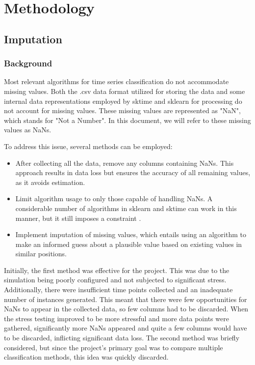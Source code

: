 \chapter{Methodology}

\section{Imputation}

\subsection{Background}
Most relevant algorithms for time series classification do not accommodate missing values. Both the .csv data format utilized for storing the data and some internal data representations employed by sktime and sklearn for processing do not account for missing values. These missing values are represented as "NaN", which stands for "Not a Number". In this document, we will refer to these missing values as NaNs.

To address this issue, several methods can be employed:
\begin{itemize}
\item After collecting all the data, remove any columns containing NaNs. This approach results in data loss but ensures the accuracy of all remaining values, as it avoids estimation.
\item Limit algorithm usage to only those capable of handling NaNs. A considerable number of algorithms in sklearn and sktime can work in this manner, but it still imposes a constraint \cite*{Scikit-learn-imputation}.
\item Implement imputation of missing values, which entails using an algorithm to make an informed guess about a plausible value based on existing values in similar positions.
\end{itemize}

Initially, the first method was effective for the project. This was due to the simulation being poorly configured and not subjected to significant stress. Additionally, there were insufficient time points collected and an inadequate number of instances generated. This meant that there were few opportunities for NaNs to appear in the collected data, so few columns had to be discarded. When the stress testing improved to be more stressful and more data points were gathered, significantly more NaNs appeared and quite a few columns would have to be discarded, inflicting significant data loss.
The second method was briefly considered, but since the project's primary goal was to compare multiple classification methods, this idea was quickly discarded.

